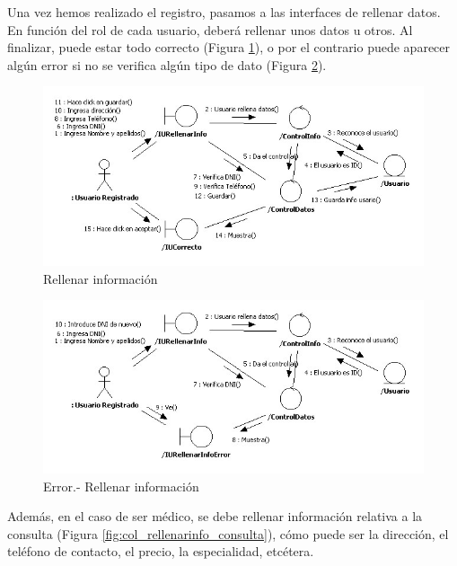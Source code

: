 		Una vez hemos realizado el registro, pasamos a las interfaces de rellenar datos. En función del rol de cada usuario, deberá rellenar unos datos u otros. Al finalizar, puede estar todo correcto (Figura \ref{fig:col_rellenarinfo}), o por el contrario puede aparecer algún error si no se verifica algún tipo de dato (Figura \ref{fig:col_rellenarinfo_err}).
		
		\begin{figure}[H]
		  \centering
		    \includegraphics[width=16cm]{img/jpg/colaboraciones/19_RellenarInfo.jpg}
		  \caption{Rellenar información}
		  \label{fig:col_rellenarinfo}
		\end{figure}
		
		\begin{figure}[H]
		  \centering
		    \includegraphics[width=16cm]{img/jpg/colaboraciones/20_RellenarInfoError.jpg}
		  \caption{Error.- Rellenar información}
		  \label{fig:col_rellenarinfo_err}
		\end{figure}
		
		Además, en el caso de ser médico, se debe rellenar información relativa a la consulta (Figura \ref{fig:col_rellenarinfo_consulta}), cómo puede ser la dirección, el teléfono de contacto, el precio, la especialidad, etcétera.
		
